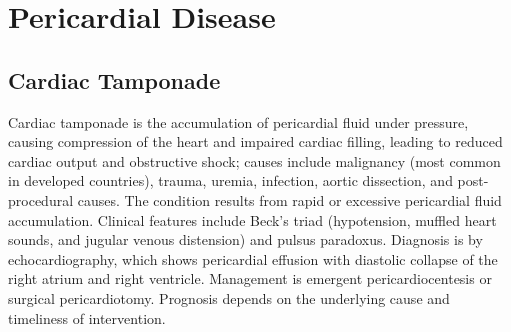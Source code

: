 \section{Pericardial Disease}








\label{sec:Pericardial Disease}

\subsection{Cardiac Tamponade}
\label{sec:Cardiac Tamponade}
Cardiac tamponade is the accumulation of pericardial fluid under pressure, causing compression of the heart and impaired cardiac filling, leading to reduced cardiac output and obstructive shock; causes include malignancy (most common in developed countries), trauma, uremia, infection, aortic dissection, and post-procedural causes. The condition results from rapid or excessive pericardial fluid accumulation. Clinical features include Beck's triad (hypotension, muffled heart sounds, and jugular venous distension) and pulsus paradoxus. Diagnosis is by echocardiography, which shows pericardial effusion with diastolic collapse of the right atrium and right ventricle. Management is emergent pericardiocentesis or surgical pericardiotomy. Prognosis depends on the underlying cause and timeliness of intervention.

